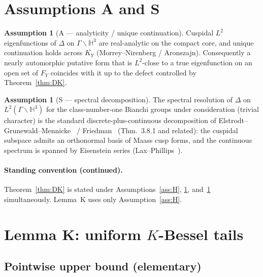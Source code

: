 \documentclass[11pt]{amsart}
\theoremstyle{definition}
\newtheorem{assumption}[theorem]{Assumption}
\newcommand{\HH}{\mathbb{H}^3}
\begin{document}
\section{Assumptions A and S}
\label{sec:AS}

\begin{assumption}[A --- analyticity / unique continuation]
\label{ass:A}
Cuspidal $L^2$ eigenfunctions of $\Delta$ on $\Gamma\backslash\HH$ are
real-analytic on the compact core, and unique continuation holds across
$\overline{K_Y}$ (Morrey--Nirenberg / Aronszajn).  Consequently a nearly
automorphic putative form that is $L^2$-close to a true eigenfunction on
an open set of $F_Y$ coincides with it up to the defect controlled by
Theorem~\ref{thm:DK}.
\end{assumption}

\begin{assumption}[S --- spectral decomposition]
\label{ass:S}
The spectral resolution of $\Delta$ on $L^2(\Gamma\backslash\HH)$ for the
class-number-one Bianchi groups under consideration (trivial character)
is the standard discrete-plus-continuous decomposition of
Elstrodt--Grunewald--Mennicke~\cite{EGM} / Friedman~\cite{Friedman}
(Thm.~3.8.1 and related): the cuspidal subspace admits an orthonormal
basis of Maass cusp forms, and the continuous spectrum is spanned by
Eisenstein series (Lax--Phillips~\cite{LP}).
\end{assumption}

\paragraph{Standing convention (continued).}
Theorem~\ref{thm:DK} is stated under Assumptions~\ref{ass:H}, \ref{ass:A},
and~\ref{ass:S} simultaneously.  Lemma~K uses only Assumption~\ref{ass:H}.

\section{Lemma K: uniform $K$-Bessel tails}
\label{sec:lemmaK}

\subsection{Pointwise upper bound (elementary)}
\end{document}

